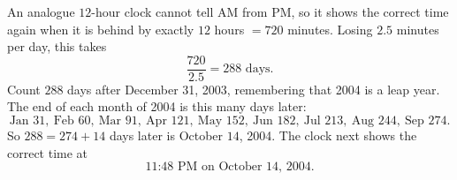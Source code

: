 An analogue $12$-hour clock cannot tell AM from PM, so it shows the correct time again when it is behind by exactly $12$ hours $=720$ minutes. Losing $2.5$ minutes per day, this takes
\[\dfrac{720}{2.5}=288\text{ days}.\]
Count $288$ days after December 31, 2003, remembering that 2004 is a leap year. The end of each month of 2004 is this many days later:
\[\text{Jan }31,\ \text{Feb }60,\ \text{Mar }91,\ \text{Apr }121,\ \text{May }152,\ \text{Jun }182,\ \text{Jul }213,\ \text{Aug }244,\ \text{Sep }274.\]
So $288=274+14$ days later is October $14$, 2004. The clock next shows the correct time at
\[\boxed{\text{11{:}48 PM on October 14, 2004}}.\]
